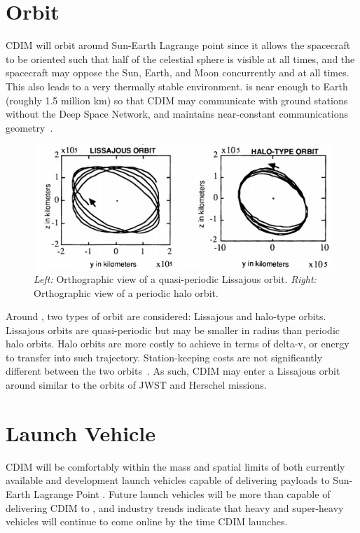 \documentclass{ws-jai}
\begin{document}
\section{Orbit}
\label{sec:orbit}
CDIM will orbit around Sun-Earth Lagrange point \Ltwo{} since it allows the spacecraft to be oriented such that half of the celestial sphere is visible at all times, and the spacecraft may oppose the Sun, Earth, and Moon concurrently and at all times.
This also leads to a very thermally stable environment.
\Ltwo{} is near enough to Earth (roughly 1.5 million \si{\kilo\meter}) so that CDIM may communicate with ground stations without the Deep Space Network, and maintains near-constant communications geometry~\cite{canalias2004}.

\begin{figure}[!ht]
  \centering
  \includegraphics[width=.6\linewidth]{figs/orbits.png}
  \caption{
      \emph{Left:} Orthographic view of a quasi-periodic Lissajous orbit.
      \emph{Right:} Orthographic view of a periodic halo orbit.~\cite{gordon1991orbit}
\label{fig:orbits}
  }
\end{figure}

Around \Ltwo, two types of orbit are considered: Lissajous and halo-type orbits.
Lissajous orbits are quasi-periodic but may be smaller in radius than periodic halo orbits.
Halo orbits are more costly to achieve in terms of delta-v, or energy to transfer into such trajectory.
Station-keeping costs are not significantly different between the two orbits~\cite{gordon1991orbit}.
As such, CDIM may enter a Lissajous orbit around \Ltwo{} similar to the orbits of JWST and Herschel missions.

\section{Launch Vehicle}
\label{sec:launch}
CDIM will be comfortably within the mass and spatial limits of both currently available and development launch vehicles capable of delivering payloads to Sun-Earth Lagrange Point \Ltwo.
Future launch vehicles will be more than capable of delivering CDIM to \Ltwo, and industry trends indicate that heavy and super-heavy vehicles will continue to come online by the time CDIM launches.
\end{document}
